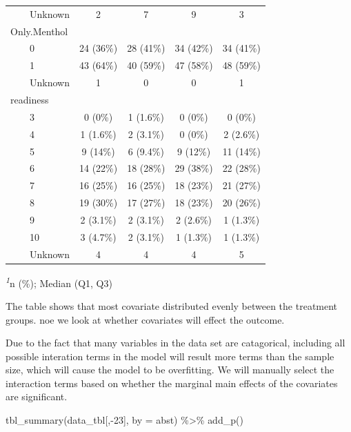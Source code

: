 \documentclass[
  letterpaper,
  DIV=11,
  numbers=noendperiod]{scrartcl}
\newenvironment{Shaded}{\begin{snugshade}}{\end{snugshade}}
\newcommand{\AttributeTok}[1]{\textcolor[rgb]{0.40,0.45,0.13}{#1}}
\newcommand{\DecValTok}[1]{\textcolor[rgb]{0.68,0.00,0.00}{#1}}
\newcommand{\FunctionTok}[1]{\textcolor[rgb]{0.28,0.35,0.67}{#1}}
\newcommand{\NormalTok}[1]{\textcolor[rgb]{0.00,0.23,0.31}{#1}}
\newcommand{\SpecialCharTok}[1]{\textcolor[rgb]{0.37,0.37,0.37}{#1}}
\begin{document}
\begin{longtable*}{lcccc}
    Unknown & 2 & 7 & 9 & 3 \\ 
Only.Menthol &  &  &  &  \\ 
    0 & 24 (36\%) & 28 (41\%) & 34 (42\%) & 34 (41\%) \\ 
    1 & 43 (64\%) & 40 (59\%) & 47 (58\%) & 48 (59\%) \\ 
    Unknown & 1 & 0 & 0 & 1 \\ 
readiness &  &  &  &  \\ 
    3 & 0 (0\%) & 1 (1.6\%) & 0 (0\%) & 0 (0\%) \\ 
    4 & 1 (1.6\%) & 2 (3.1\%) & 0 (0\%) & 2 (2.6\%) \\ 
    5 & 9 (14\%) & 6 (9.4\%) & 9 (12\%) & 11 (14\%) \\ 
    6 & 14 (22\%) & 18 (28\%) & 29 (38\%) & 22 (28\%) \\ 
    7 & 16 (25\%) & 16 (25\%) & 18 (23\%) & 21 (27\%) \\ 
    8 & 19 (30\%) & 17 (27\%) & 18 (23\%) & 20 (26\%) \\ 
    9 & 2 (3.1\%) & 2 (3.1\%) & 2 (2.6\%) & 1 (1.3\%) \\ 
    10 & 3 (4.7\%) & 2 (3.1\%) & 1 (1.3\%) & 1 (1.3\%) \\ 
    Unknown & 4 & 4 & 4 & 5 \\ 
\bottomrule
\end{longtable*}
\begin{minipage}{\linewidth}
\textsuperscript{\textit{1}}n (\%); Median (Q1, Q3)\\
\end{minipage}
\endgroup

The table shows that most covariate distributed evenly between the
treatment groups. noe we look at whether covariates will effect the
outcome.

Due to the fact that many variables in the data set are catagorical,
including all possible interation terms in the model will result more
terms than the sample size, which will cause the model to be
overfitting. We will manually select the interaction terms based on
whether the marginal main effects of the covariates are significant.

\begin{Shaded}
\begin{Highlighting}[]
\FunctionTok{tbl\_summary}\NormalTok{(data\_tbl[,}\SpecialCharTok{{-}}\DecValTok{23}\NormalTok{], }\AttributeTok{by =}\NormalTok{ abst) }\SpecialCharTok{\%\textgreater{}\%}
  \FunctionTok{add\_p}\NormalTok{() }
\end{Highlighting}
\end{Shaded}
\end{document}
